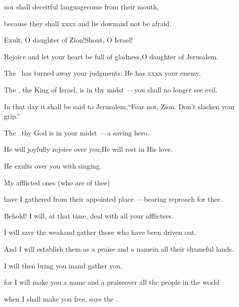 \begin{inparaenum}
  \pa{}nor shall deceitful language\pa{}come from their mouth,%

  \pa{}because they shall xxxx %
  and lie down\pa{}and not be afraid.%

  \pa{} Exult, O daughter of Zion!\pa{}Shout, O Israel!%

  \pa{}Rejoice and let your heart be full of gladness,\pa{}O daughter of Jerusalem.%

  \pa{} The \lord\ has turned away your judgments;
  He has xxxx %
  your enemy.%

  \pa{}The \lord, the King of Israel, is in thy midst~---\pa{}you shall no longer see evil.%

  \pa{} In that day it shall be said to Jerusalem,\pa{}``Fear not, Zion. Don't slacken your grip.''%

  \pa{} The \lord\ thy God is in your midst~---\pa{}a saving hero.%

  \pa{}He will joyfully rejoice over you;\pa{}He will rest in His love.%

  \pa{}He exults over you with singing.%

  \pa{} My afflicted ones (who are of thee)%

  \pa{}have I gathered from their appointed place~---\pa{}bearing reproach for thee.%

  \pa{} Behold! I will, at that time, deal with all your afflicters.%

  \pa{}I will save the weak\pa{}and gather those who have been driven out.%

  \pa{}And I will establish them as a praise and a name\pa{}in all their shameful lands.%

  \pa{} I will then bring you in\pa{}and gather you,%

  \pa{}for I will make you a name and a praise\pa{}over all the people in the world%

  \pa{}when I shall make you free, says the \lord.%
\end{inparaenum}
